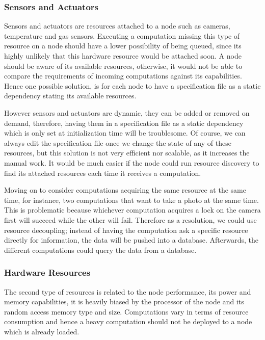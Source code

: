 \subsubsection{Sensors and Actuators}

  Sensors and actuators are resources attached to a node such as cameras, temperature and gas sensors. Executing a computation missing this type of resource on a node should have a lower possibility of being queued, since its highly unlikely that this hardware resource would be attached soon. A node should be aware of its available resources, otherwise, it would not be able to compare the requirements of incoming computations against its capabilities. Hence one possible solution, is for each node to have a specification file as a static dependency stating its available resources.
  
  However sensors and actuators are dynamic, they can be added or removed on demand, therefore, having them in a specification file as a static dependency which is only set at initialization time will be troublesome. Of course, we can always edit the specification file once we change the state of any of these resources, but this solution is not very efficient nor scalable, as it increases the manual work. It would be much easier if the node could run resource discovery to find its attached resources each time it receives a computation.
  
  Moving on to consider computations acquiring the same resource at the same time, for instance, two computations that want to take a photo at the same time. This is problematic because whichever computation acquires a lock on the camera first will succeed while the other will fail. Therefore as a resolution, we could use resource decoupling; instead of having the computation ask a specific resource directly for information, the  data will be pushed into a database. Afterwards, the different computations could query the data from a database.
  
  

\subsubsection{Hardware Resources }

The second type of resources is related to the node performance, its power and memory capabilities, it is heavily biased by the processor of the node and its random access memory type and size. Computations vary in terms of resource consumption and hence a heavy computation should not be deployed to a node which is already loaded. 

